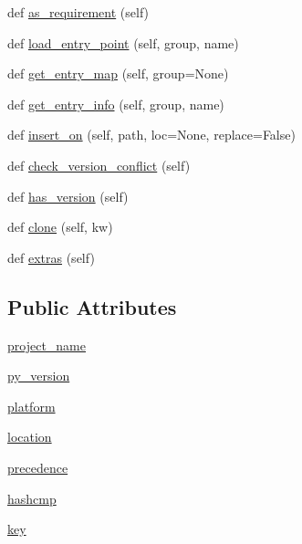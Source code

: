 \begin{DoxyCompactItemize}
\item 
def \hyperlink{classpip_1_1__vendor_1_1pkg__resources_1_1Distribution_a80af36e436571d5d02e27e627829fd6c}{as\+\_\+requirement} (self)
\item 
def \hyperlink{classpip_1_1__vendor_1_1pkg__resources_1_1Distribution_a263ed52645359c1a003f0f8b0bfd666f}{load\+\_\+entry\+\_\+point} (self, group, name)
\item 
def \hyperlink{classpip_1_1__vendor_1_1pkg__resources_1_1Distribution_a071694d579dea10a7352c109e2a33cbd}{get\+\_\+entry\+\_\+map} (self, group=None)
\item 
def \hyperlink{classpip_1_1__vendor_1_1pkg__resources_1_1Distribution_a57c40c9f6cf2793650b4e73ebaf1adf5}{get\+\_\+entry\+\_\+info} (self, group, name)
\item 
def \hyperlink{classpip_1_1__vendor_1_1pkg__resources_1_1Distribution_aa808bc24580f0d7069eaaabaecf74b47}{insert\+\_\+on} (self, path, loc=None, replace=False)
\item 
def \hyperlink{classpip_1_1__vendor_1_1pkg__resources_1_1Distribution_a5b0f8b69f0754d26bb9ba04a7f4b1045}{check\+\_\+version\+\_\+conflict} (self)
\item 
def \hyperlink{classpip_1_1__vendor_1_1pkg__resources_1_1Distribution_acc58f778b2bb60f7b306e4d1bdef759e}{has\+\_\+version} (self)
\item 
def \hyperlink{classpip_1_1__vendor_1_1pkg__resources_1_1Distribution_a2b60bafbc49a6a9c07978ab5d1eb8cb2}{clone} (self, kw)
\item 
def \hyperlink{classpip_1_1__vendor_1_1pkg__resources_1_1Distribution_a12c47b7c03dfb6dab9166ca5cb53b464}{extras} (self)
\end{DoxyCompactItemize}
\subsection*{Public Attributes}
\begin{DoxyCompactItemize}
\item 
\hyperlink{classpip_1_1__vendor_1_1pkg__resources_1_1Distribution_a30fef0754544a369e2128dd2352aa9ea}{project\+\_\+name}
\item 
\hyperlink{classpip_1_1__vendor_1_1pkg__resources_1_1Distribution_a381f168e72cef0cc74b72287a26c699b}{py\+\_\+version}
\item 
\hyperlink{classpip_1_1__vendor_1_1pkg__resources_1_1Distribution_a5d03a7cf6aaaa05c79406f87646d830c}{platform}
\item 
\hyperlink{classpip_1_1__vendor_1_1pkg__resources_1_1Distribution_affb4f9c968acd530b5f4abc9af8ddd8d}{location}
\item 
\hyperlink{classpip_1_1__vendor_1_1pkg__resources_1_1Distribution_ae9dbb44a7b380ab090ed6a8d44d0a47a}{precedence}
\item 
\hyperlink{classpip_1_1__vendor_1_1pkg__resources_1_1Distribution_a828c73206701d0976187716ecd42ece1}{hashcmp}
\item 
\hyperlink{classpip_1_1__vendor_1_1pkg__resources_1_1Distribution_a5654f3a35763ffac3c23579d041b83d3}{key}
\end{DoxyCompactItemize}
